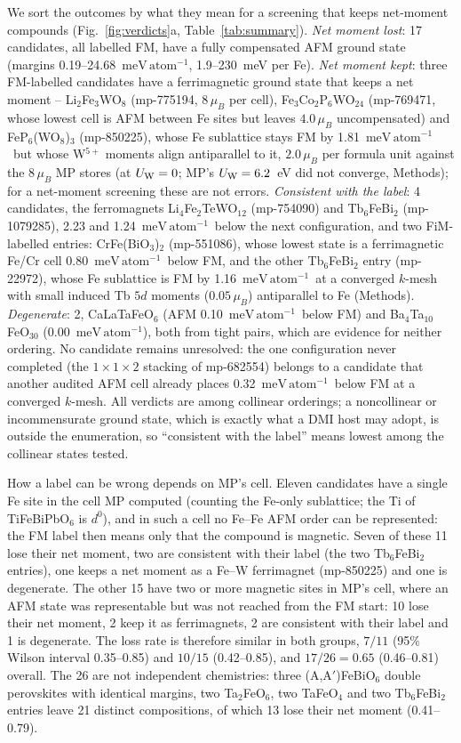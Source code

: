 \documentclass[aps,prb,preprint,superscriptaddress,longbibliography,nofootinbib]{revtex4-2}
\newcommand{\meVat}{\ensuremath{\mathrm{meV\,atom^{-1}}}}
\begin{document}
We sort the outcomes by what they mean for a screening that keeps net-moment compounds
(Fig.~\ref{fig:verdicts}a, Table~\ref{tab:summary}). \emph{Net moment lost}: 17 candidates, all labelled FM, have a fully
compensated AFM ground state (margins
0.19--24.68~\meVat, 1.9--230~meV per Fe). \emph{Net moment kept}: three FM-labelled candidates have a
ferrimagnetic ground state that keeps a net moment -- Li$_2$Fe$_3$WO$_8$ (mp-775194, $8\,\mu_B$ per cell),
Fe$_3$Co$_2$P$_6$WO$_{24}$ (mp-769471, whose lowest cell is AFM between Fe sites but leaves $4.0\,\mu_B$
uncompensated) and FeP$_6$(WO$_8$)$_3$ (mp-850225), whose Fe sublattice stays FM by 1.81~\meVat\ but whose
W$^{5+}$ moments align antiparallel to it, $2.0\,\mu_B$ per formula unit against the $8\,\mu_B$ MP stores
(at $U_{\rm W}=0$; MP's $U_{\rm W}=6.2$~eV did not converge, Methods); for a net-moment screening these are not errors. \emph{Consistent with the label}: 4 candidates, the
ferromagnets Li$_4$Fe$_2$TeWO$_{12}$ (mp-754090) and Tb$_6$FeBi$_2$ (mp-1079285), 2.23 and 1.24~\meVat\ below
the next configuration, and two FiM-labelled entries: CrFe(BiO$_3$)$_2$ (mp-551086), whose lowest state is a
ferrimagnetic Fe/Cr cell 0.80~\meVat\ below FM, and the other Tb$_6$FeBi$_2$ entry (mp-22972), whose Fe
sublattice is FM by 1.16~\meVat\ at a converged $k$-mesh with small induced Tb $5d$ moments ($0.05\,\mu_B$)
antiparallel to Fe (Methods).
\emph{Degenerate}: 2,
CaLaTaFeO$_6$ (AFM 0.10~\meVat\ below FM) and Ba$_4$Ta$_{10}$FeO$_{30}$ (0.00~\meVat), both from tight pairs,
which are evidence for neither ordering. No candidate remains unresolved: the one configuration never completed
(the $1\times1\times2$ stacking of mp-682554) belongs to a candidate that another audited AFM cell already
places 0.32~\meVat\ below FM at a converged $k$-mesh. All verdicts are among collinear orderings; a noncollinear or incommensurate
ground state, which is exactly what a DMI host may adopt, is outside the enumeration, so ``consistent with the
label'' means lowest among the collinear states tested.

How a label can be wrong depends on MP's cell. Eleven candidates have a single Fe site in the cell MP computed
(counting the Fe-only sublattice; the Ti of TiFeBiPbO$_6$ is $d^0$), and in such a cell no Fe--Fe AFM order can be
represented: the FM label then means only that the compound is magnetic. Seven of these 11 lose their net
moment, two are consistent with their label (the two Tb$_6$FeBi$_2$ entries), one keeps a net moment as a Fe--W ferrimagnet (mp-850225) and one is
degenerate. The other 15 have two or more magnetic
sites in MP's cell, where an AFM state was representable but was not reached from the FM start: 10 lose their
net moment, 2 keep it as ferrimagnets, 2 are consistent with their label and 1 is degenerate. The loss rate is
therefore similar in both groups, $7/11$ (95\% Wilson interval 0.35--0.85) and $10/15$ (0.42--0.85), and
$17/26=0.65$ (0.46--0.81) overall. The 26 are not independent chemistries: three (A,A$'$)FeBiO$_6$ double
perovskites with identical margins, two Ta$_2$FeO$_6$, two TaFeO$_4$ and two Tb$_6$FeBi$_2$ entries leave 21
distinct compositions, of which 13 lose their net moment (0.41--0.79).
\end{document}
